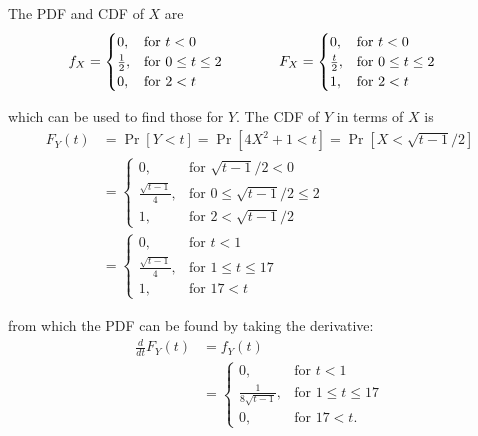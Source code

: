 \documentclass[11pt]{article}
\begin{document}
\begin{solution}
    
\begin{Parts}
    
\Part The PDF and CDF of $X$ are
\[
    \begin{array}{c@{\hspace{3em}}c}
        \begin{split}
            f_X &= \begin{cases}
                0, & \text{for } t < 0 \\
                \frac{1}{2}, & \text{for } 0 \leq t \leq 2 \\
                0, & \text{for } 2 < t
            \end{cases}
        \end{split}
        &
        \begin{split}
            F_X &= \begin{cases}
                0, & \text{for } t < 0 \\
                \frac{t}{2}, & \text{for } 0 \leq t \leq 2 \\
                1, & \text{for } 2 < t               
            \end{cases}
        \end{split}
    \end{array}
\]

which can be used to find those for $Y$. The CDF of $Y$ in terms of $X$ is
\[
    \begin{split}
        F_Y(t) &= \Pr[Y < t] = \Pr[4X^2+1 < t] = \Pr[X < \sqrt{t-1}/2] \\
        &= \begin{cases}
            0, & \text{for } \sqrt{t-1}/2 < 0 \\
            \frac{\sqrt{t-1}}{4}, & \text{for } 0 \leq \sqrt{t-1}/2 \leq 2 \\
            1, & \text{for } 2 < \sqrt{t-1}/2
        \end{cases} \\
        &= \begin{cases}
            0, & \text{for } t < 1 \\
            \frac{\sqrt{t-1}}{4}, & \text{for } 1 \leq t \leq 17 \\
            1, & \text{for } 17 < t
        \end{cases}
    \end{split}
\]

from which the PDF can be found by taking the derivative:
\[
    \begin{split}
        \frac{d}{dt} F_Y(t) &= f_Y(t) \\
        &= \begin{cases}
            0, & \text{for } t < 1 \\
            \frac{1}{8\sqrt{t-1}}, & \text{for } 1 \leq t \leq 17 \\
            0, & \text{for } 17 < t.
        \end{cases}
    \end{split}
\]


\end{Parts}
\end{solution}
\end{document}
